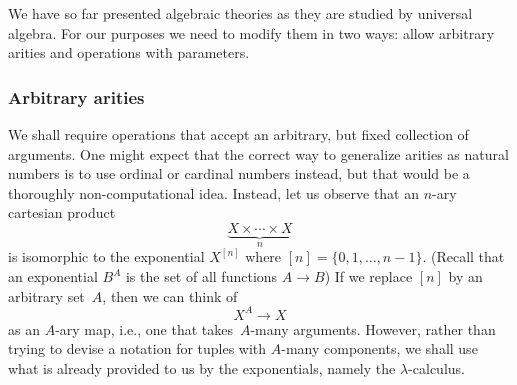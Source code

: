 \documentclass{amsart}
\newcommand{\set}[1]{\{#1\}} %
\begin{document}
We have so far presented algebraic theories as they are studied by universal algebra. For
our purposes we need to modify them in two ways: allow arbitrary arities and operations
with parameters.

\subsubsection{Arbitrary arities}
\label{sec:arbitrary-arities}

We shall require operations that accept an arbitrary, but fixed collection of
arguments. One might expect that the correct way to generalize arities as
natural numbers is to use ordinal or cardinal numbers instead, but that would be
a thoroughly non-computational idea. Instead, let us observe that an $n$-ary
cartesian product
%
\begin{equation*}
  \underbrace{X \times \cdots \times X}_{n}
\end{equation*}
%
is isomorphic to the exponential $X^{[n]}$ where
$[n] = \set{0, 1, \ldots, n-1}$. (Recall that an exponential $B^A$ is the set of
all functions $A \to B$) If we replace $[n]$ by an arbitrary set~$A$, then we can think of
%
\begin{equation*}
  X^A \to X
\end{equation*}
%
as an $A$-ary map, i.e., one that takes~$A$-many arguments. However, rather than
trying to devise a notation for tuples with $A$-many components, we shall use
what is already provided to us by the exponentials, namely the $\lambda$-calculus.
\end{document}
